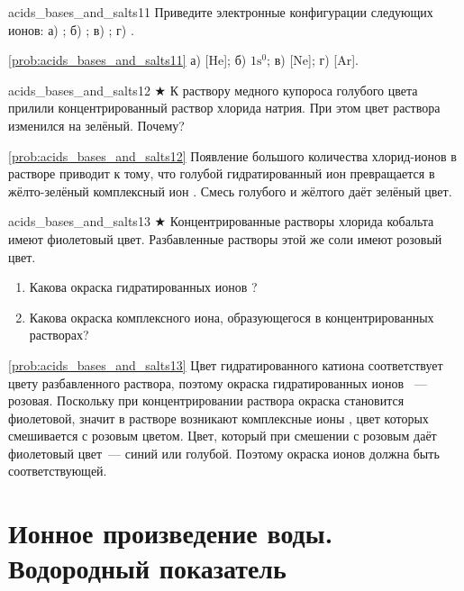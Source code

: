 \begin{problem}{}{acids_bases_and_salts11}
    Приведите электронные конфигурации следующих ионов: а) ; б) ; в) ; г) .
    \begin{sol}{\ref{prob:acids_bases_and_salts11}}
        а) [He]; б) $1\text{s}^0$; в) [Ne]; г) [Ar].
    \end{sol}
\end{problem}

\begin{problem}{}{acids_bases_and_salts12}
    $\bigstar$ К раствору медного купороса голубого цвета прилили концентрированный раствор хлорида натрия. При этом цвет раствора изменился на зелёный. Почему?
    \begin{sol}{\ref{prob:acids_bases_and_salts12}}
        Появление большого количества хлорид-ионов в растворе приводит к тому, что голубой гидратированный ион  превращается в жёлто-зелёный комплексный ион . Смесь голубого и жёлтого даёт зелёный цвет.
    \end{sol}
\end{problem}

\begin{problem}{}{acids_bases_and_salts13}
    $\bigstar$ Концентрированные растворы хлорида кобальта  имеют фиолетовый цвет. Разбавленные растворы этой же соли имеют розовый цвет.
    \begin{enumerate}[label=\arabic*)]
        \item Какова окраска гидратированных ионов ?
        \item Какова окраска комплексного иона, образующегося в концентрированных растворах?
    \end{enumerate}
    \begin{sol}{\ref{prob:acids_bases_and_salts13}}
        Цвет гидратированного катиона соответствует цвету разбавленного раствора, поэтому окраска гидратированных ионов ~--- розовая. Поскольку при концентрировании раствора окраска становится фиолетовой, значит в растворе возникают комплексные ионы , цвет которых смешивается с розовым цветом. Цвет, который при смешении с розовым даёт фиолетовый цвет~--- синий или голубой. Поэтому окраска ионов  должна быть соответствующей.
    \end{sol}
\end{problem}

\clearpage

\section{Ионное произведение воды. Водородный показатель}

